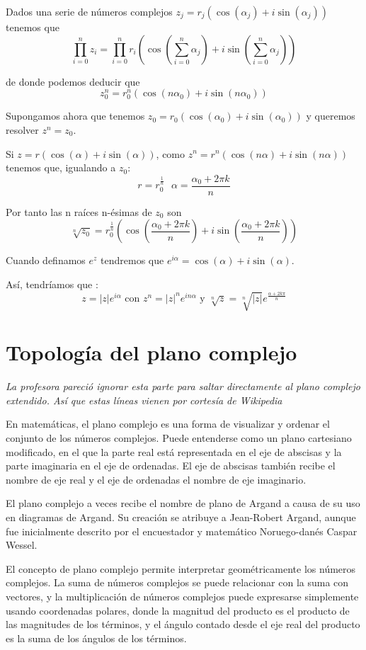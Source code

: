 \documentclass{apuntes}
\begin{document}
\begin{example}
Dados una serie de números complejos $z_j=r_j(\cos(α_j)+i\sin(α_j))$ tenemos que
\[\prod_{i=0}^n z_i = \prod_{i=0}^nr_i\left(\cos(\sum_{i=0}^n α_j)+i\sin(\sum_{i=0}^n α_j)\right)\]

de donde podemos deducir que
\[z_0^n = r_0^n(\cos(nα_0)+i\sin(nα_0))\]
\end{example}

Supongamos ahora que tenemos $z_0=r_0(\cos(α_0)+i\sin(α_0))$ y queremos resolver $z^n=z_0$.

Si $z=r(\cos(α)+i\sin(α))$, como $z^n=r^n(\cos(nα)+i\sin(nα))$ tenemos que, igualando a $z_0$:
\[r=r_0^{\frac{1}{n}} \ \ \ α=\frac{α_0+2πk}{n}\]

Por tanto las n raíces n-ésimas de $z_0$ son
\[\sqrt[n]{z_0}=r_0^{\frac{1}{n}}\left(\cos\left(\frac{α_0+2πk}{n}\right)+i\sin\left(\frac{α_0+2πk}{n}\right)\right)\]

Cuando definamos $e^z$ tendremos que $e^{iα}=\cos(α)+i\sin(α)$.

Así, tendríamos que :
\[z=|z|e^{iα} \text{ con } z^n=|z|^ne^{inα} \text{ y } \sqrt[n]{z}=\sqrt[n]{|z|}e^{\frac{α+2kπ}{n}}\]
\section{Topología del plano complejo}
\textit{La profesora pareció ignorar esta parte para saltar directamente al plano complejo extendido. Así que estas líneas vienen por cortesía de Wikipedia}

En matemáticas, el plano complejo es una forma de visualizar y ordenar el conjunto de los números complejos. Puede entenderse como un plano cartesiano modificado, en el que la parte real está representada en el eje de abscisas y la parte imaginaria en el eje de ordenadas. El eje de abscisas también recibe el nombre de eje real y el eje de ordenadas el nombre de eje imaginario.

El plano complejo a veces recibe el nombre de plano de Argand a causa de su uso en diagramas de Argand. Su creación se atribuye a Jean-Robert Argand, aunque fue inicialmente descrito por el encuestador y matemático Noruego-danés Caspar Wessel.

El concepto de plano complejo permite interpretar geométricamente los números complejos. La suma de números complejos se puede relacionar con la suma con vectores, y la multiplicación de números complejos puede expresarse simplemente usando coordenadas polares, donde la magnitud del producto es el producto de las magnitudes de los términos, y el ángulo contado desde el eje real del producto es la suma de los ángulos de los términos.
\end{document}
